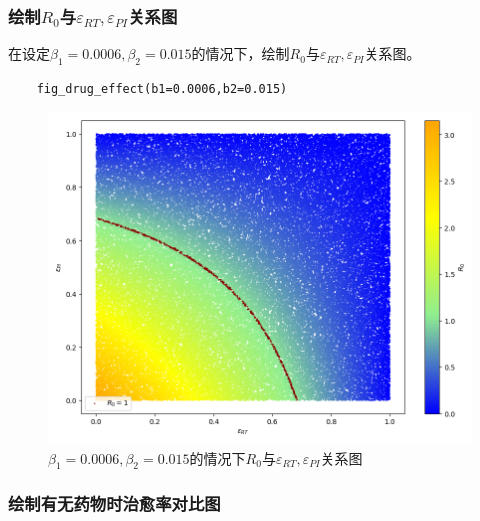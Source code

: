 \documentclass{ctexart}
\begin{document}
    \subsubsection{绘制$R_{0}$与$\varepsilon _{RT},\varepsilon _{PI}$关系图}
    在设定$\beta_{1}=0.0006,\beta_{2}=0.015$的情况下，绘制$R_{0}$与$\varepsilon _{RT},\varepsilon _{PI}$关系图。
    \begin{lstlisting}
    fig_drug_effect(b1=0.0006,b2=0.015)
\end{lstlisting}
    \begin{figure}[H]
        \centering
        \includegraphics[width=0.8\linewidth]{5.png}
        \caption{$\beta_{1}=0.0006,\beta_{2}=0.015$的情况下$R_{0}$与$\varepsilon _{RT},\varepsilon _{PI}$关系图}
        \label{fig.5}
    \end{figure}

    \subsubsection{绘制有无药物时治愈率对比图}
\end{document}
